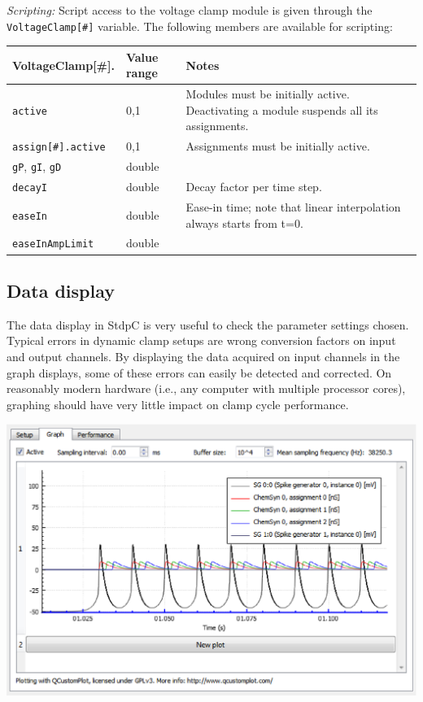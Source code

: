 \documentclass{article}
\begin{document}
\noindent
\emph{Scripting:} Script access to the voltage clamp module is given through the
\texttt{VoltageClamp[\#]} variable. The following members are available for scripting: \\
\begin{tabularx}{\linewidth}{|ll|X|}
\hline
{\bf VoltageClamp[\#].\textvisiblespace} & {\bf Value range} & {\bf Notes} \\
\hline
\texttt{active} & 0,1 & Modules must be initially active. Deactivating a module suspends all
its assignments. \\
\texttt{assign[\#].active} & 0,1 & Assignments must be initially active. \\
\texttt{gP}, \texttt{gI}, \texttt{gD} & double &\\
\texttt{decayI} & double & Decay factor per time step.\\
\texttt{easeIn} & double & Ease-in time; note that linear interpolation always starts from t=0.\\
\texttt{easeInAmpLimit} & double &\\
\hline
\end{tabularx}

\subsection{Data display}
The data display in StdpC is very useful to check the parameter
settings chosen. Typical errors in dynamic clamp setups are wrong
conversion factors on input and output channels. By displaying the
data acquired on input channels in the graph displays, some of these
errors can easily be detected and corrected. On reasonably modern
hardware (i.e., any computer with multiple processor cores), graphing
should have very little impact on clamp cycle performance. \\[0.2cm]
\parbox{\textwidth}{
  \includegraphics[scale=0.6]{graphBlock}
} \\[0.2cm]
\end{document}
